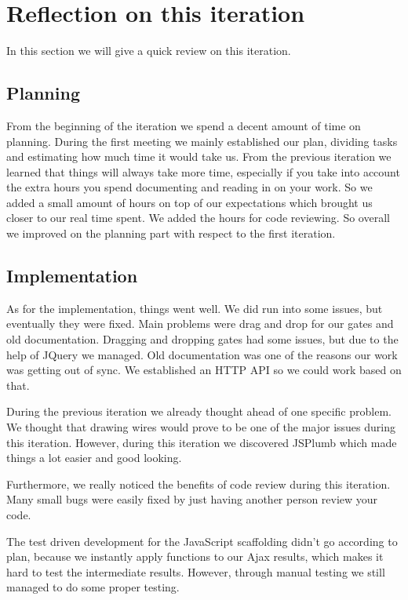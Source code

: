 \documentclass[a4paper]{article}
\begin{document}
\section{Reflection on this iteration}
In this section we will give a quick review on this iteration. \\

\subsection{Planning}
From the beginning of the iteration we spend a decent amount of time on planning. During the first meeting we mainly established our plan, dividing tasks and estimating how much time it would take us. From the previous iteration we learned that things will always take more time, especially if you take into account the extra hours you spend documenting and reading in on your work. So we added a small amount of hours on top of our expectations which brought us closer to our real time spent. We added the hours for code reviewing. So overall we improved on the planning part with respect to the first iteration. 

\subsection{Implementation}
As for the implementation, things went well. We did run into some issues, but eventually they were fixed. Main problems were drag and drop for our gates and old documentation. 
Dragging and dropping gates had some issues, but due to the help of JQuery we managed.
Old documentation was one of the reasons our work was getting out of sync. We established an HTTP API so we could work based on that. 

During the previous iteration we already thought ahead of one specific problem. We thought that drawing wires would prove to be one of the major issues during this iteration. However, during this iteration we discovered JSPlumb which made things a lot easier and good looking.

Furthermore, we really noticed the benefits of code review during this iteration. Many small bugs were easily fixed by just having another person review your code.

The test driven development for the JavaScript scaffolding didn't go according to plan, because we instantly apply functions to our Ajax results, which makes it hard to test the intermediate results. However, through manual testing we still managed to do some proper testing.
\end{document}
